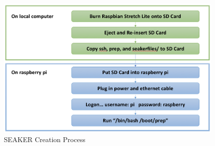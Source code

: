 \documentclass[12pt]{article}
\begin{document}
\begin{figure}[ht]
  \begin{center}
  \includegraphics[width=14cm]{images/SeakerCreation.png}
  \caption{SEAKER Creation Process}\label{fig:SeakerCreation}
  \end{center}
\end{figure}
\end{document}
